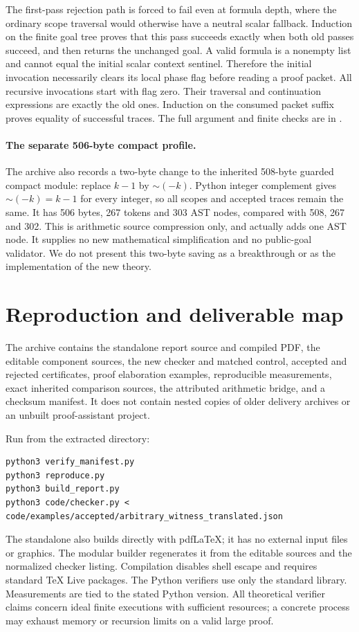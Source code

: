 \documentclass[11pt,letterpaper]{article}
\theoremstyle{definition}\newtheorem{definition}[theorem]{Definition}
\theoremstyle{remark}\newtheorem{remark}[theorem]{Remark}
\begin{document}
The first-pass rejection path is forced to fail even at formula depth, where
the ordinary scope traversal would otherwise have a neutral scalar fallback.
Induction on the finite goal tree proves that this pass succeeds exactly when
both old passes succeed, and then returns the unchanged goal. A valid formula
is a nonempty list and cannot equal the initial scalar context sentinel.
Therefore the initial invocation necessarily clears its local phase flag
before reading a proof packet. All recursive invocations start with flag zero.
Their traversal and continuation expressions are exactly the old ones.
Induction on the consumed packet suffix proves equality of successful traces.
The full argument and finite checks are in .

\paragraph{The separate 506-byte compact profile.}
The archive also records a two-byte change to the inherited 508-byte
guarded compact module: replace $k-1$ by $\mathord\sim(-k)$. Python integer
complement gives $\mathord\sim(-k)=k-1$ for every integer, so all scopes
and accepted traces remain the same. It has 506 bytes, 267 tokens and
303 AST nodes, compared with 508, 267 and 302. This is arithmetic
source compression only, and actually adds one AST node. It supplies no
new mathematical simplification and no public-goal validator. We do not
present this two-byte saving as a breakthrough or as the implementation of
the new theory.

\section{Reproduction and deliverable map}

The archive contains the standalone report source and compiled PDF, the
editable component sources, the new checker and matched control, accepted
and rejected certificates, proof elaboration examples, reproducible
measurements, exact inherited comparison sources, the attributed arithmetic
bridge, and a checksum manifest. It does not contain nested copies of older
delivery archives or an unbuilt proof-assistant project.

Run from the extracted directory:
\begin{lstlisting}[language={}]
python3 verify_manifest.py
python3 reproduce.py
python3 build_report.py
python3 code/checker.py < code/examples/accepted/arbitrary_witness_translated.json
\end{lstlisting}
The standalone  also builds directly
with pdfLaTeX; it has no external input files or graphics. The modular builder
regenerates it from the editable sources and the normalized checker listing.
Compilation disables shell escape and requires standard TeX Live packages.
The Python verifiers use only the standard library. Measurements are tied to
the stated Python version. All theoretical verifier claims concern ideal
finite executions with sufficient resources; a concrete process may exhaust
memory or recursion limits on a valid large proof.
\end{document}

